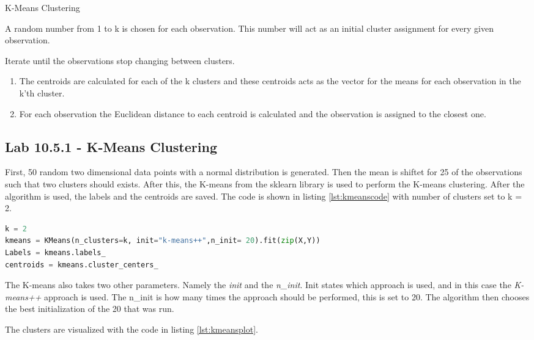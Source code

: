 \begin{algorithm}
	\caption{K-Means Clustering}
	\label{algo:KMeansClustering}
	\begin{algorithmic}[1]
		\State A random number from 1 to k is chosen for each observation. This number will act as an initial cluster assignment for every given observation.
		
		\State 
		Iterate until the observations stop changing between clusters.
		\begin{enumerate}[label=(\alph*)]
			\item The centroids are calculated for each of the k clusters and these centroids acts as the vector for the means for each observation in the k'th cluster.
			
			\item For each observation the Euclidean distance to each centroid is calculated and the observation is assigned to the closest one.
		\end{enumerate}
	\end{algorithmic}
\end{algorithm}

\subsection{Lab 10.5.1 - K-Means Clustering}
First, 50 random two dimensional data points with a normal distribution is generated. Then the mean is shiftet for 25 of the observations such that two clusters should exists. After this, the K-means from the sklearn library is used to perform the K-means clustering.
After the algorithm is used, the labels and the centroids are saved. The code is shown in listing \ref{lst:kmeanscode} with number of clusters set to k = 2.
\begin{lstlisting}[language=Python, label=lst:kmeanscode, caption=The KMeans function]
k = 2
kmeans = KMeans(n_clusters=k, init="k-means++",n_init= 20).fit(zip(X,Y))
Labels = kmeans.labels_
centroids = kmeans.cluster_centers_
\end{lstlisting}

The K-means also takes two other parameters. Namely the \emph{init} and the \emph{n\_init}. Init states which approach is used, and in this case the \emph{K-means++} approach is used. The n\_init is how many times the approach should be performed, this is set to 20. The algorithm then chooses the best initialization of the 20 that was run.

The clusters are visualized with the code in listing \ref{lst:kmeansplot}.

